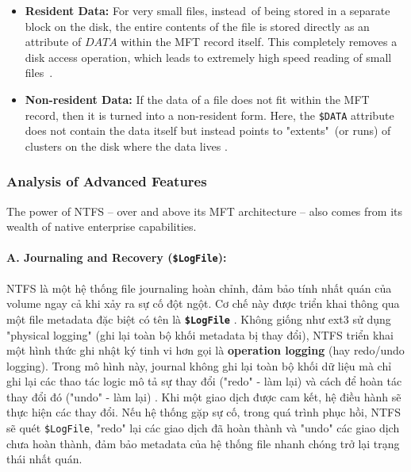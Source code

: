 \documentclass[12pt]{article}
\begin{document}
\begin{itemize}
    \item \textbf{Resident Data:} For very small files, instead of being stored in a separate block on the disk, the entire contents of the file is stored directly as an attribute of $DATA$ within the MFT record itself. This completely removes a disk access operation, which leads to extremely high speed reading of small files \parencite{CIRCL2023}.
    
    \item \textbf{Non-resident Data:} If the data of a file does not fit within the MFT record, then it is turned into a non-resident form. Here, the \texttt{\$DATA} attribute does not contain the data itself but instead points to "extents" (or runs) of clusters on the disk where the data lives \parencite{HarvardCS161Journaling}.
\end{itemize}

\subsubsection{Analysis of Advanced Features}
The power of NTFS – over and above its MFT architecture – also comes from its wealth of native enterprise capabilities.

\paragraph{A. Journaling and Recovery (\texttt{\$LogFile}):}
NTFS là một hệ thống file journaling hoàn chỉnh, đảm bảo tính nhất quán của volume ngay cả khi xảy ra sự cố đột ngột. Cơ chế này được triển khai thông qua một file metadata đặc biệt có tên là \textbf{\texttt{\$LogFile}} \parencite{Shafiei2012}. Không giống như ext3 sử dụng "physical logging" (ghi lại toàn bộ khối metadata bị thay đổi), NTFS triển khai một hình thức ghi nhật ký tinh vi hơn gọi là \textbf{operation logging} (hay redo/undo logging). Trong mô hình này, journal không ghi lại toàn bộ khối dữ liệu mà chỉ ghi lại các thao tác logic mô tả sự thay đổi ("redo" - làm lại) và cách để hoàn tác thay đổi đó ("undo" - làm lại) \parencite{HarvardCS161Journaling}. Khi một giao dịch được cam kết, hệ điều hành sẽ thực hiện các thay đổi. Nếu hệ thống gặp sự cố, trong quá trình phục hồi, NTFS sẽ quét \texttt{\$LogFile}, "redo" lại các giao dịch đã hoàn thành và "undo" các giao dịch chưa hoàn thành, đảm bảo metadata của hệ thống file nhanh chóng trở lại trạng thái nhất quán.
\end{document}
